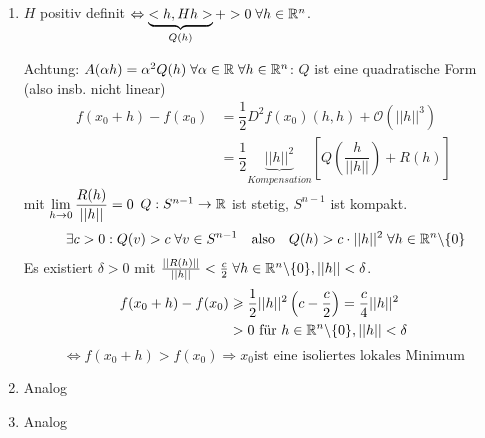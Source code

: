 \documentclass[main.tex]{subfiles}
\begin{document}
\begin{Beweis}
  \begin{enumerate}
    \item $H$ positiv definit $\Leftrightarrow \underbrace{<h,Hh>}_{Q(h)} +> 0 \;\forall h \in \mathbb{R}^n$.

      Achtung: $A(\alpha h) = \alpha^2 Q(h) \;\forall \alpha \in \mathbb{R} \;\forall h \in \mathbb{R}^n$: $Q$ ist eine quadratische Form (also insb. nicht linear)
      \begin{align*}
        f(x_0 + h) - f(x_0) & = \dfrac{1}{2} D^2f(x_0)(h,h) + \mathcal{O}(||h||^3) \\
        & = \dfrac{1}{2} \underbrace{||h||^2}_{Kompensation}\left[ Q\left(\dfrac{h}{||h||}\right) + R(h)\right]
      \end{align*}
      mit $\lim \limits_{h \to 0} \dfrac{R(h)}{||h||} = 0$
      $Q: S^{n-1} \to \mathbb{R}$ ist stetig, $S^{n-1}$ ist kompakt.
      $$\;\exists c > 0 : Q(v) > c \;\forall v \in S^{n-1} \quad \text{also} \quad Q(h) > c \cdot ||h||^2 \;\forall h \in \mathbb{R}^n\backslash\{0\}$$
      Es existiert $\delta > 0$ mit $\frac{||R(h)||}{||h||} < \frac{c}{2} \;\forall h \in \mathbb{R}^n\backslash\{0\},||h|| < \delta$.
      $$\begin{aligned}
        f(x_0 + h) - f(x_0) & \geqslant \dfrac{1}{2} ||h||^2 \left(c - \dfrac{c}{2}\right) = \dfrac{c}{4}||h||^2 \\
        & > 0 \text{ für } h \in \mathbb{R}^n\backslash\{0\}, ||h|| < \delta
      \end{aligned}$$
      $$\Leftrightarrow f(x_0 + h) > f(x_0) \Rightarrow x_0 \text{ist eine isoliertes lokales Minimum}$$
    \item Analog
    \item Analog
  \end{enumerate}
\end{Beweis}
\end{document}
